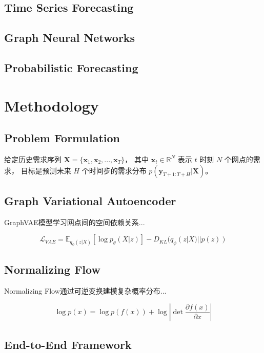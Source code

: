 \documentclass[review]{elsarticle}
\begin{document}
\subsection{Time Series Forecasting}

\subsection{Graph Neural Networks}

\subsection{Probabilistic Forecasting}

\section{Methodology}
\label{sec:method}

\subsection{Problem Formulation}
给定历史需求序列 $\mathbf{X} = \{\mathbf{x}_1, \mathbf{x}_2, ..., \mathbf{x}_T\}$，
其中 $\mathbf{x}_t \in \mathbb{R}^N$ 表示 $t$ 时刻 $N$ 个网点的需求，
目标是预测未来 $H$ 个时间步的需求分布 $p(\mathbf{y}_{T+1:T+H} | \mathbf{X})$。

\subsection{Graph Variational Autoencoder}
GraphVAE模型学习网点间的空间依赖关系...

\begin{equation}
\mathcal{L}_{VAE} = \mathbb{E}_{q_{\phi}(z|X)}[\log p_{\theta}(X|z)] - D_{KL}(q_{\phi}(z|X) || p(z))
\end{equation}

\subsection{Normalizing Flow}
Normalizing Flow通过可逆变换建模复杂概率分布...

\begin{equation}
\log p(x) = \log p(f(x)) + \log \left| \det \frac{\partial f(x)}{\partial x} \right|
\end{equation}

\subsection{End-to-End Framework}
\end{document}
